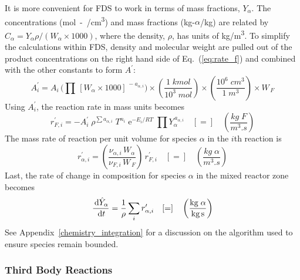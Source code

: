 It is more convenient for FDS to work in terms of mass fractions, $Y_{\alpha}$.  The concentrations (\unit{mol-\alpha/cm^3}) and mass fractions (kg-$\alpha$/kg) are related by $C_{\alpha}=Y_{\alpha} \rho/(W_{\alpha} \times 1000)$, where the density, $\rho$, has units of \si{kg/m^3}.
To simplify the calculations within FDS, density and molecular weight are pulled out of the product concentrations on the right hand side of Eq.~(\ref{eq:rate_f}) and combined with the other constants to form $A^{\prime}$:
\begin{equation}\label{eq:aprime}
A^{\prime}_{i} = A_{i} \, \bigg( \prod \, [W_{\alpha} \times 1000]^{\,-a_{\alpha,i}} \bigg) \times \left(\frac{1 \; \si{kmol}}{10^3 \; \si{mol}}\right) \times \left(\frac{10^6 \; \si{cm^3}}{1 \; \si{m^3}}\right) \times W_{\,\si{F}}
\end{equation}
Using $A_i^{\prime}$, the reaction rate in mass units becomes
\begin{equation}\label{eq:finite_rate_fin}
r^{\prime}_{\si{F},i} = -A_i^{\prime}\;\rho^{\sum a_{\alpha,i}}\;T^{n_i}\;\mathrm{e}^{-E_i/RT}\;\prod Y_{\alpha}^{\,a_{\alpha,i}} \quad [=] \quad \left(\frac{\si{kg \; F}}{\si{m^3.s}}\right)
\end{equation}
The mass rate of reaction per unit volume for species $\alpha$ in the $i$th reaction is
\begin{equation}\label{eq:rate_a_y}
r^{\prime}_{\alpha,i}= \left(\frac{\nu_{\alpha,i}\,W_{\alpha}}{\nu_{\si{F},i}\,W_{\,\si{F}}}\right)\,r^{\prime}_{\si{F},i} \quad [=] \quad \left(\frac{\si{kg \; \alpha}}{\si{m^3.s}}\right)
\end{equation}
Last, the rate of change in composition for species $\alpha$ in the mixed reactor zone becomes
\begin{equation}\label{rate_expression_y}
\frac{\d \hat{Y}_{\alpha}}{\d t} = \frac{1}{\rho}\sum_{i} r^{\prime}_{\alpha,i} \quad [=] \quad \left(\frac{\si{kg \; \alpha}}{\si{kg.s}}\right)
\end{equation}
See Appendix~\ref{chemistry_integration} for a discussion on the algorithm used to ensure species remain bounded.

\subsubsection{Third Body Reactions}

